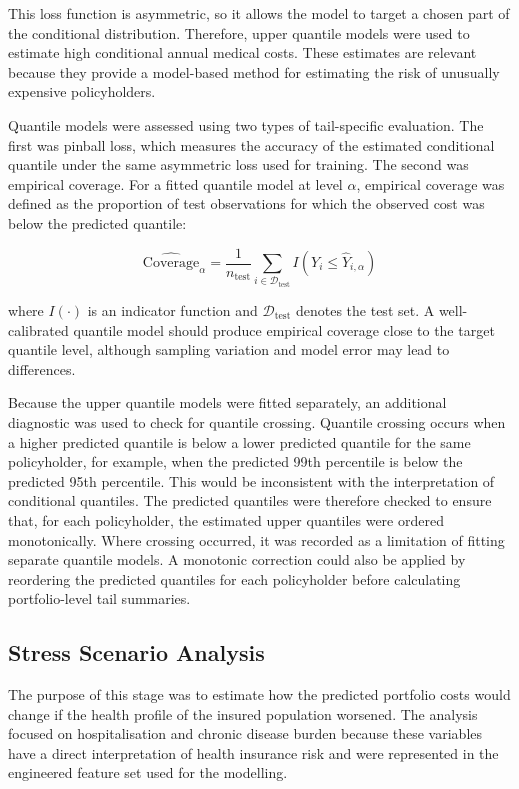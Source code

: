 	This loss function is asymmetric, so it allows the model to target a chosen part of the conditional distribution. Therefore, upper quantile models were used to estimate high conditional annual medical costs. These estimates are relevant because they provide a model-based method for estimating the risk of unusually expensive policyholders.
	
	Quantile models were assessed using two types of tail-specific evaluation. The first was pinball loss, which measures the accuracy of the estimated conditional quantile under the same asymmetric loss used for training. The second was empirical coverage. For a fitted quantile model at level \(\alpha\), empirical coverage was defined as the proportion of test observations for which the observed cost was below the predicted quantile:
	
	\begin{equation}
		\widehat{\mathrm{Coverage}}_{\alpha}
		=
		\frac{1}{n_{\mathrm{test}}}
		\sum_{i \in \mathcal{D}_{\mathrm{test}}}
		I(Y_i \leq \hat{Y}_{i,\alpha})
	\end{equation}
	
	where \(I(\cdot)\) is an indicator function and \(\mathcal{D}_{\mathrm{test}}\) denotes the test set. A well-calibrated quantile model should produce empirical coverage close to the target quantile level, although sampling variation and model error may lead to differences.
	
	Because the upper quantile models were fitted separately, an additional diagnostic was used to check for quantile crossing. Quantile crossing occurs when a higher predicted quantile is below a lower predicted quantile for the same policyholder, for example, when the predicted 99th percentile is below the predicted 95th percentile. This would be inconsistent with the interpretation of conditional quantiles. The predicted quantiles were therefore checked to ensure that, for each policyholder, the estimated upper quantiles were ordered monotonically. Where crossing occurred, it was recorded as a limitation of fitting separate quantile models. A monotonic correction could also be applied by reordering the predicted quantiles for each policyholder before calculating portfolio-level tail summaries.
	
	\subsection{Stress Scenario Analysis}
	
	The purpose of this stage was to estimate how the predicted portfolio costs would change if the health profile of the insured population worsened. The analysis focused on hospitalisation and chronic disease burden because these variables have a direct interpretation of health insurance risk and were represented in the engineered feature set used for the modelling.
	
